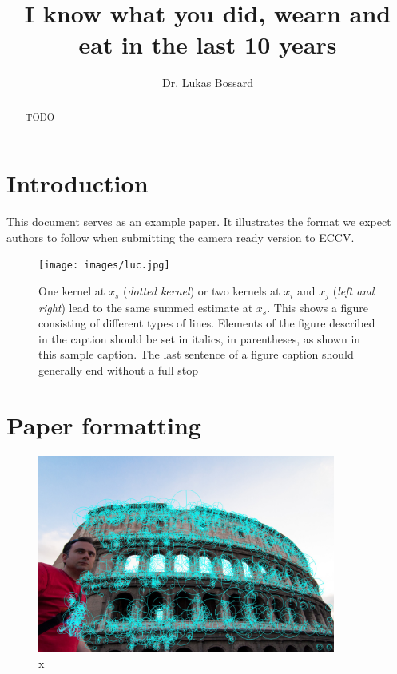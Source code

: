 \documentclass[runningheads]{llncs}
\begin{document}
\pagestyle{headings}
\mainmatter
\title{I know what you did, wearn and eat in the last 10 years} %



\author{Dr. Lukas Bossard}


\maketitle

\begin{abstract}
TODO
\end{abstract}


\section{Introduction}




This document serves as an example paper. It illustrates the format
we expect authors to follow when submitting the camera ready version to ECCV. 

\begin{figure}
\centering
\texttt{[image: images/luc.jpg]}
\caption{One kernel at $x_s$ ({\it dotted kernel}) or two kernels at
$x_i$ and $x_j$ ({\it left and right}) lead to the same summed estimate
at $x_s$. This shows a figure consisting of different types of
lines. Elements of the figure described in the caption should be set in
italics,
in parentheses, as shown in this sample caption. The last
sentence of a figure caption should generally end without a full stop}
\label{fig:example}
\end{figure}


\section{Paper formatting}


\begin{figure}
\centering
\includegraphics[height=6.5cm]{images/gabriele.jpg}
\caption{x}
\label{fig:example}
\end{figure}
\end{document}
